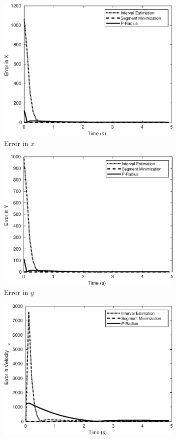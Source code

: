 \begin{figure}[h!]
\begin{subfigure}{.5\textwidth}
\centering
\includegraphics[width=.8\linewidth]{figures/errorsX}
\caption{Error in $x$}
\end{subfigure}
\begin{subfigure}{.5\textwidth}
\centering
\includegraphics[width=.8\linewidth]{figures/errorsY}
\caption{Error in $y$}
\end{subfigure}
\begin{subfigure}{.5\textwidth}
\centering
\includegraphics[width=.8\linewidth]{figures/errorsVelocity_x}

\end{subfigure}
\end{figure}
